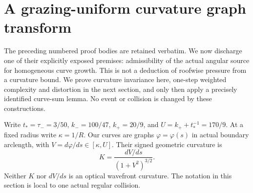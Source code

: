 \section{A grazing-uniform curvature graph transform}
\label{sec:uc-curvature}
The preceding numbered proof bodies are retained verbatim. We now discharge
one of their explicitly exposed premises: admissibility of the actual angular
source for homogeneous curve growth. This is not a deduction of roofwise
pressure from a curvature bound. We prove curvature invariance here,
one-step weighted complexity and distortion in the next section, and only
then apply a precisely identified curve-sum lemma. No event or collision is
changed by these constructions.

Write $t_*=\tau_-=3/50$, $k_-=100/47$, $k_+=20/9$, and
$U=k_++t_*^{-1}=170/9$. At a fixed radius write $\kappa=1/R$.
Our curves are graphs $\varphi=\varphi(s)$ in actual boundary arclength,
with $V=d\varphi/ds\in[\kappa,U]$. Their signed geometric curvature is
\[
              K=\frac{dV/ds}{(1+V^2)^{3/2}}.
\]
Neither $K$ nor $dV/ds$ is an optical wavefront curvature.
The notation in this section is local to one actual regular collision.

